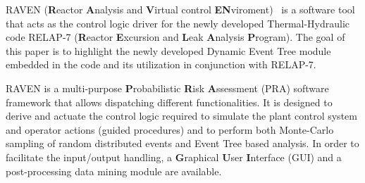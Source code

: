 \documentclass{mc2013}
\begin{document}
\setlength{\baselineskip}{14pt}
\normalsize

RAVEN (\textbf{R}eactor \textbf{A}nalysis and \textbf{V}irtual control \textbf{EN}viroment)~\cite{ravenFY12,mandelliANS2012} is a software tool that acts as the control logic driver for the newly developed Thermal-Hydraulic code RELAP-7  (\textbf{R}eactor \textbf{E}xcursion and \textbf{L}eak \textbf{A}nalysis \textbf{P}rogram). The goal of this paper is to highlight the newly developed  Dynamic Event Tree module embedded in the code and its utilization in conjunction with RELAP-7. 

RAVEN is a multi-purpose \textbf{P}robabilistic \textbf{R}isk \textbf{A}ssessment (PRA) software framework that allows dispatching different functionalities. 
It is designed to derive and actuate the control logic required to simulate the plant control system and operator actions (guided procedures) and to perform both Monte-Carlo sampling of random distributed events and Event Tree based analysis. 
In order to facilitate the input/output handling, a \textbf{G}raphical \textbf{U}ser \textbf{I}nterface (GUI) and a post-processing data mining module are available.
\end{document}
